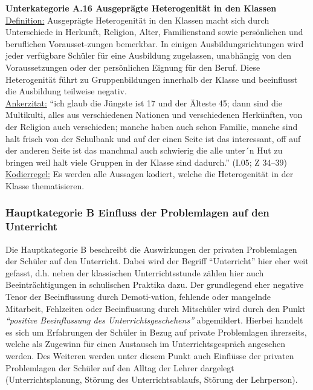 \textbf{Unterkategorie A.16 Ausgeprägte Heterogenität in den Klassen}\\
\underline{Definition:} Ausgeprägte Heterogenität in den Klassen macht sich durch Unterschiede in Herkunft, Religion, Alter, Familienstand sowie persönlichen und beruflichen Vorausset-zungen bemerkbar. In einigen Ausbildungsrichtungen wird jeder verfügbare Schüler für eine Ausbildung zugelassen, unabhängig von den Voraussetzungen oder der persönlichen Eignung für den Beruf. Diese Heterogenität führt zu Gruppenbildungen innerhalb der Klasse und beeinflusst die Ausbildung teilweise negativ.\\
\underline{Ankerzitat:} "`ich glaub die Jüngste ist 17 und der Älteste 45; dann sind die Multikulti, alles aus verschiedenen Nationen und verschiedenen Herkünften, von der Religion auch verschieden; manche haben auch schon Familie, manche sind halt frisch von der Schulbank und auf der einen Seite ist das interessant, off auf der anderen Seite ist das manchmal auch schwierig die alle unter´n Hut zu bringen weil halt viele Gruppen in der Klasse sind dadurch."' (I.05; Z 34--39)\\
\underline{Kodierregel:} Es werden alle Aussagen kodiert, welche die Heterogenität in der Klasse thematisieren.\\

\subsubsection{Hauptkategorie B Einfluss der Problemlagen auf den Unterricht}
\label{sec:HauptkategorieBEinflussDerProblemlagenAufDenUnterricht}

Die Hauptkategorie B beschreibt die Auswirkungen der privaten Problemlagen der Schüler auf den Unterricht. Dabei wird der Begriff "`Unterricht"' hier eher weit gefasst, d.h. neben der klassischen Unterrichtsstunde zählen hier auch Beeinträchtigungen in schulischen Praktika dazu. Der grundlegend eher negative Tenor der Beeinflussung durch Demoti-vation, fehlende oder mangelnde Mitarbeit, Fehlzeiten oder Beeinflussung durch Mitschüler wird durch den Punkt \textit{"`positive Beeinflussung des Unterrichtsgeschehens"'} abgemildert. Hierbei handelt es sich um Erfahrungen der Schüler in Bezug auf private Problemlagen ihrerseits, welche als Zugewinn für einen Austausch im Unterrichtsgespräch angesehen werden. Des Weiteren werden unter diesem Punkt auch Einflüsse der privaten Problemlagen der Schüler auf den Alltag der Lehrer dargelegt (Unterrichtsplanung, Störung des Unterrichtsablaufs, Störung der Lehrperson).\\

